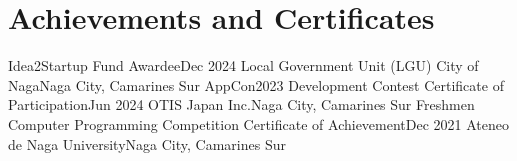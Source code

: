 \section{Achievements and Certificates}

\resumeSubHeadingListStart
    \resumeSubheading
        {Idea2Startup Fund Awardee}{Dec 2024}
        {Local Government Unit (LGU) City of Naga}{Naga City, Camarines Sur}
        \resumeItemListStart
        \resumeItemListEnd
        \resumeSubheading
        {AppCon2023 Development Contest Certificate of Participation}{Jun 2024}
        {OTIS Japan Inc.}{Naga City, Camarines Sur}
        \resumeSubheading
        {Freshmen Computer Programming Competition Certificate of Achievement}{Dec 2021}
        {Ateneo de Naga University}{Naga City, Camarines Sur}
        \resumeItemListStart
        \resumeItemListEnd
\resumeSubHeadingListEnd
